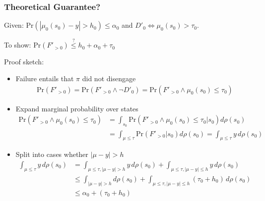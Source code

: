 \documentclass[handout]{beamer}
\begin{document}
\begin{frame}
    \frametitle{Theoretical Guarantee?}

    {\tiny
    Given: $\text{Pr}(|\mu_0(s_0) - y| > h_0) \leq \alpha_0$ and $D'_0 \Leftrightarrow \mu_0(s_0) > \tau_0$.

    To show: $\text{Pr}(F'_{>0}) \overset{?}{\leq} h_0 + \alpha_0 + \tau_0$

    Proof sketch:
    \begin{itemize}

    \item Failure entails that $\pi$ did not disengage
    \begin{align*}
    \text{Pr}(F'_{>0})  = \text{Pr}(F'_{>0} \wedge \neg D'_0) = \text{Pr}(F'_{>0} \wedge \mu_0(s_0) \leq \tau_0)
    \end{align*}

    \item Expand marginal probability over states
    \begin{align*}
    \text{Pr}(F'_{>0} \wedge \mu_0(s_0) \leq \tau_0)
         &= \int_{s_0}\text{Pr}(F'_{>0} \wedge \mu_0(s_0) \leq \tau_0|s_0)d\rho(s_0) \\
         &= \int_{\mu \leq \tau}\text{Pr}(F'_{>0}|s_0)d\rho(s_0) = \int_{\mu \leq \tau}y\, d\rho(s_0)
    \end{align*}

    \item Split into cases whether $|\mu - y|>h$
    \begin{align*}
    \int_{\mu \leq \tau}y\, d\rho(s_0)
        &= \int_{\mu \leq \tau, |\mu-y|>h} y\, d\rho(s_0) + \int_{\mu \leq \tau, |\mu-y|\leq h} y\, d\rho(s_0) \\
        &\leq \int_{|\mu-y|>h}d\rho(s_0) + \int_{\mu \leq \tau, |\mu-y|\leq h} (\tau_0+h_0)\, d\rho(s_0) \\
        &\leq \alpha_0 + (\tau_0+h_0)
    \end{align*}
    \end{itemize}
    }
\end{frame}
\end{document}
